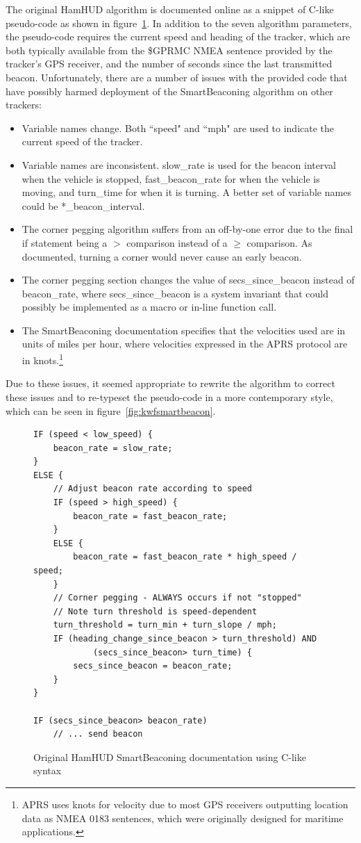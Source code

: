 The original HamHUD algorithm is documented online as a snippet of C-like 
pseudo-code as shown in figure~\ref{fig:hamhudsmartbeacon}.
In addition to the seven algorithm parameters, the pseudo-code
requires the current speed and heading of the tracker, which are both
typically available from the \$GPRMC NMEA sentence \cite{nmearmc} provided by the 
tracker's GPS receiver, and the number of seconds since the last transmitted beacon.
Unfortunately, there are a number of issues with the provided code that
have possibly harmed deployment of the SmartBeaconing algorithm on other trackers:
\begin{itemize}
	\item Variable names change. Both ``speed" and ``mph" are used 
		to indicate the current speed of the tracker.
	\item Variable names are inconsistent. 
		slow\_rate is used for the beacon interval when the vehicle is stopped, 
		fast\_beacon\_rate for when the vehicle is moving,
		and turn\_time for when it is turning.
		A better set of variable names could be *\_beacon\_interval.
	\item The corner pegging algorithm suffers from an off-by-one error due to
		the final if statement being a $>$ comparison instead
		of a $\geq$ comparison. As documented, turning a corner would
		never cause an early beacon.
	\item The corner pegging section changes the value of secs\_since\_beacon
		instead of beacon\_rate, where secs\_since\_beacon is a system
		invariant that could possibly be implemented as a macro
		or in-line function call.
	\item The SmartBeaconing documentation specifies that 
		the velocities used are in units
		of miles per hour, where velocities expressed in the APRS
		protocol are in knots.\footnote{APRS uses knots for velocity
			due to most GPS receivers outputting location
			data as NMEA 0183 sentences, which were originally designed 
			for maritime applications.}
\end{itemize}

Due to these issues, it seemed appropriate to rewrite the algorithm 
to correct these issues and to re-typeset the pseudo-code in a more
contemporary style, which can be seen in figure~\ref{fig:kwfsmartbeacon}.

\begin{figure}[p]
\begin{lstlisting}
IF (speed < low_speed) {
	beacon_rate = slow_rate;
}
ELSE {
	// Adjust beacon rate according to speed
	IF (speed > high_speed) {
		beacon_rate = fast_beacon_rate;
	}
	ELSE {
		beacon_rate = fast_beacon_rate * high_speed / speed;
	}
	// Corner pegging - ALWAYS occurs if not "stopped"
	// Note turn threshold is speed-dependent
	turn_threshold = turn_min + turn_slope / mph;
	IF (heading_change_since_beacon > turn_threshold) AND
			(secs_since_beacon> turn_time) {
		secs_since_beacon = beacon_rate;
	}
}

IF (secs_since_beacon> beacon_rate)
	// ... send beacon
\end{lstlisting}
\caption{Original HamHUD SmartBeaconing documentation using C-like syntax}
\label{fig:hamhudsmartbeacon}
\end{figure}

